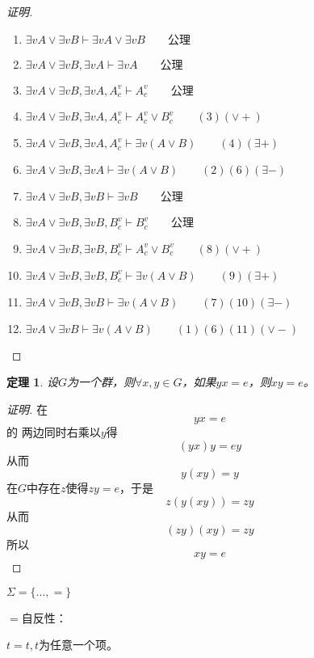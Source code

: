 \documentclass{article}
\newtheorem{Thm}{定理}
\begin{document}
\begin{CJK*}{UTF8}{gbsn}
\begin{proof}[证明]
    \begin{enumerate}
      \item $\exists v A\lor \exists v B\vdash \exists v A\lor \exists v B \qquad \text{公理}$
      \item $\exists v A\lor \exists v B, \exists v A\vdash \exists v A \qquad \text{公理}$
      \item $\exists v A\lor \exists v B, \exists v A, A_c^v\vdash A_c^v \qquad \text{公理}$
      \item  $\exists v A\lor \exists v B, \exists v A, A_c^v\vdash A_c^v \lor B_c^v\qquad (3)(\lor +)$
      \item  $\exists v A\lor \exists v B, \exists v A, A_c^v\vdash \exists v(A\lor B)\qquad (4)(\exists +)$
      \item $\exists v A\lor \exists v B, \exists v A\vdash \exists v(A\lor B)\qquad (2)(6)(\exists -)$
      \item $\exists v A\lor \exists v B, \exists v B\vdash \exists v B \qquad \text{公理}$
      \item $\exists v A\lor \exists v B, \exists v B, B_c^v\vdash B_c^v \qquad \text{公理}$
      \item  $\exists v A\lor \exists v B, \exists v B, B_c^v\vdash A_c^v \lor B_c^v\qquad (8)(\lor +)$
      \item  $\exists v A\lor \exists v B, \exists v B, B_c^v\vdash \exists v(A\lor B)\qquad (9)(\exists +)$
      \item $\exists v A\lor \exists v B, \exists v B\vdash \exists v(A\lor B)\qquad (7)(10)(\exists -)$
      \item $\exists v A\lor \exists v B\vdash \exists v(A\lor B)\qquad (1)(6)(11)(\lor -)$
    \end{enumerate}   
  \end{proof}



  \begin{Thm}
    设$G$为一个群，则$\forall x,y\in G$，如果$yx=e$，则$xy=e$。
  \end{Thm}
  \begin{proof}[证明]
    在\[yx=e\]的
    两边同时右乘以$y$得
    \[(yx)y=ey\]
    从而
    \[y(xy)=y\]
    在$G$中存在$z$使得$zy=e$，于是
    \[z(y(xy))=zy\]
    从而
    \[(zy)(xy)=zy\]
    所以
    \[xy=e\]
  \end{proof}

$\Sigma=\{...,=\}$

$=$自反性：

$t=t,t$为任意一个项。


\end{CJK*}
\end{document}
